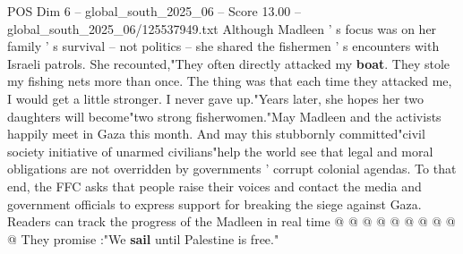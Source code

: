 \begin{textsample}{POS Dim 6 – global\_south\_2025\_06 – Score 13.00 – global\_south\_2025\_06/125537949.txt}
Although Madleen ' s focus was on her family ' s survival -- not politics -- she shared the fishermen ' s encounters with Israeli patrols.
She recounted,"They often directly attacked my \textbf{boat}.
They stole my fishing nets more than once.
The thing was that each time they attacked me, I would get a little stronger.
I never gave up."Years later, she hopes her two daughters will become"two strong fisherwomen."May Madleen and the activists happily meet in Gaza this month.
And may this stubbornly committed"civil society initiative of unarmed civilians"help the world see that legal and moral obligations are not overridden by governments ' corrupt colonial agendas.
To that end, the FFC asks that people raise their voices and contact the media and government officials to express support for breaking the siege against Gaza.
Readers can track the progress of the Madleen in real time @ @ @ @ @ @ @ @ @ @ They promise :"We \textbf{sail} until Palestine is free."

\end{textsample}
